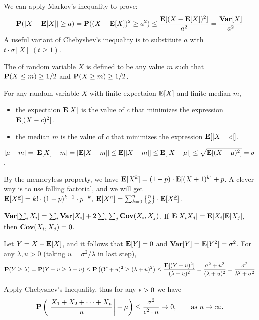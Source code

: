 \documentclass[main.tex]{subfiles}
\begin{document}
\begin{pf}
	We can apply Markov's inequality to prove:
	\[
		\mathbf{P}(|X-\mathbf{E}[X]|\ge a)=\mathbf{P}((X-\mathbf{E}[X])^2\ge a^2)\le\frac{\mathbf{E}[(X-\mathbf{E}[X])^2]}{a^2}=\frac{\mathbf{Var}[X]}{a^2}
	\]
	A useful variant of Chebyshev’s inequality is to substitute $a$ with $t\cdot\sigma[X]\;(t\ge 1)$.
\end{pf}

The  of random variable $X$ is defined to be any value $m$ such that $\mathbf{P}(X\le m)\ge 1/2$ and $\mathbf{P}(X\ge m)\ge 1/2$.

\begin{theorem}
	For any random variable $X$ with finite expectaion $\mathbf{E}[X]$ and finite median $m$,
	\begin{itemize}
		\item the expectaion $\mathbf{E}[X]$ is the value of $c$ that minimizes the expression $\mathbf{E}[(X-c)^2]$.
		\item the median $m$ is the value of $c$ that minimizes the expression $\mathbf{E}[\lvert X-c \rvert]$.
	\end{itemize}
\end{theorem}

\begin{corollary}
	$\lvert \mu-m\rvert = \lvert \mathbf{E}[X]-m\rvert = \lvert\mathbf{E}[X-m]\rvert \le \mathbf{E}[\lvert X-m\rvert]\le \mathbf{E}[\lvert X-\mu\rvert]\le \sqrt{\mathbf{E}[(X-\mu)^2]}=\sigma$.
\end{corollary}

\bigskip

 By the memoryless property, we have $\mathbf{E}[X^k]=(1-p)\cdot \mathbf{E}[(X+1)^k]+p$. A clever way is to use falling factorial, and we will get $\mathbf{E}[X^{\underline k}]=k!\cdot (1-p)^{k-1}\cdot p^{-k},\; \mathbf{E}[X^n]=\sum_{k=0}^{n}{n \brace k}\cdot \mathbf{E}[X^{\underline k}]$.

 $\mathbf{Var}[\sum_i X_i]=\sum_i\mathbf{Var}[X_i]+2\sum_i\sum_j\mathbf{Cov}(X_i,X_j)$. If $\mathbf{E}[X_iX_j]=\mathbf{E}[X_i]\mathbf{E}[X_j]$, then $\mathbf{Cov}(X_i,X_j)=0$.

  Let $Y = X - \mathbf{E}[X]$, and it follows that $\mathbf{E}[Y] = 0$ and $\mathbf{Var}[Y]=\mathbf{E}[Y^2]=\sigma^2$. For any $\lambda,u>0$ (taking $u=\sigma^2/\lambda$ in last step),
\[
	\mathbf{P}(Y\ge\lambda)=\mathbf{P}(Y+u\ge\lambda+u)\le\mathbf{P}\left((Y+u)^2\ge(\lambda+u)^2\right)\le\frac{\mathbf{E}[(Y+u)^2]}{(\lambda+u)^2}=\frac{\sigma^2+u^2}{(\lambda+u)^2}=\frac{\sigma^2}{\lambda^2+\sigma^2}
\]

  Apply Chebyshev’s Inequality, thus for any $\epsilon>0$ we have
\[
	\mathbf{P}\left(\left\lvert\frac{X_1+X_2+\cdots+X_n}{n}\right\rvert-\mu\right)\le\frac{\sigma^2}{\epsilon^2\cdot n}\rightarrow 0,\qquad \textrm{as } n\rightarrow\infty.
\]
\end{document}
